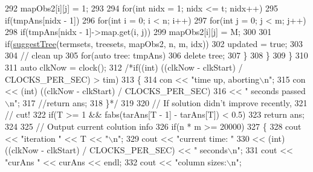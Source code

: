 \begin{DoxyCode}
292                                 mapObs2[i][j] = 1;
293                     
294                     \textcolor{keywordflow}{for}(\textcolor{keywordtype}{int} nidx = 1; nidx <= t; nidx++)
295                         \textcolor{keywordflow}{if}(tmpAns[nidx - 1])
296                             \textcolor{keywordflow}{for}(\textcolor{keywordtype}{int} i = 0; i < n; i++)
297                                 \textcolor{keywordflow}{for}(\textcolor{keywordtype}{int} j = 0; j < m; j++)
298                                     \textcolor{keywordflow}{if}(tmpAns[nidx - 1]->map.get(i, j))
299                                         mapObs2[i][j] = M;
300                     
301                     \textcolor{keywordflow}{if}(\hyperlink{classColumnGenSolve_a4ec729b2184612495e657f7ec2d644fa}{suggestTree}(termsets, treesets, mapObs2, n, m, idx))
302                         updated = \textcolor{keyword}{true};
303                     
304                     \textcolor{comment}{// clean up}
305                     \textcolor{keywordflow}{for}(\textcolor{keyword}{auto} tree: tmpAns)
306                         \textcolor{keyword}{delete} tree;
307                 \}
308             \}
309         \}
310         
311         \textcolor{keyword}{auto} clkNow = clock();
312         \textcolor{comment}{/*if((int) ((clkNow - clkStart) / CLOCKS\_PER\_SEC) > tim)}
313 \textcolor{comment}{        \{}
314 \textcolor{comment}{            con << "time up, aborting\(\backslash\)n";}
315 \textcolor{comment}{            con << (int) ((clkNow - clkStart) / CLOCKS\_PER\_SEC)}
316 \textcolor{comment}{                << " seconds passed\(\backslash\)n";}
317 \textcolor{comment}{            //return ans;}
318 \textcolor{comment}{        \}*/}
319         
320         \textcolor{comment}{// If solution didn't improve recently,}
321         \textcolor{comment}{// cut!}
322         \textcolor{keywordflow}{if}(T >= 1 && fabs(tarAns[T - 1] - tarAns[T]) < 0.5)
323             \textcolor{keywordflow}{return} ans;
324         
325         \textcolor{comment}{// Output current colution info}
326         \textcolor{keywordflow}{if}(n * m >= 20000)
327         \{
328             cout << \textcolor{stringliteral}{"iteration "} << T << \textcolor{stringliteral}{"\(\backslash\)n"};
329             cout << \textcolor{stringliteral}{"current time: "}
330                 << (int) ((clkNow - clkStart) / CLOCKS\_PER\_SEC) << \textcolor{stringliteral}{" seconds\(\backslash\)n"};
331             cout << \textcolor{stringliteral}{"curAns "} << curAns << endl;
332             cout << \textcolor{stringliteral}{"column sizes:\(\backslash\)n"};

\end{DoxyCode}
